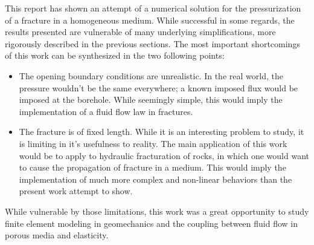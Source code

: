 \documentclass{article}
\begin{document}
This report has shown an attempt of a numerical solution for the pressurization of a fracture in a homogeneous medium. While successful in some regards, the results presented are vulnerable of many underlying simplifications, more rigorously described in the previous sections. The most important shortcomings of this work can be synthesized in the two following points:
\begin{itemize}
	\item The opening boundary conditions are unrealistic. In the real world, the pressure wouldn't be the same everywhere; a known imposed flux would be imposed at the borehole. While seemingly simple, this would imply the implementation of a fluid flow law in fractures.
	\item The fracture is of fixed length. While it is an interesting problem to study, it is limiting in it's usefulness to reality. The main application of this work would be to apply to hydraulic fracturation of rocks, in which one would want to cause the propagation of fracture in a medium. This would imply the implementation of much more complex and non-linear behaviors than the present work attempt to show.
\end{itemize}

While vulnerable by those limitations, this work was a great opportunity to study finite element modeling in geomechanics and the coupling between fluid flow in porous media and elasticity.



\end{document}
